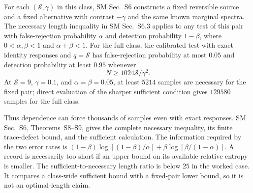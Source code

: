 \begin{theorem}\label{thm:main-cost}
For each $(\mathcal S,\gamma)$ in this class, SM Sec.~S6 constructs a fixed reversible source and a fixed alternative with contrast $-\gamma$ and the same known marginal spectra. The necessary length inequality in SM Sec.~S6.3 applies to any test of this pair with false-rejection probability $\alpha$ and detection probability $1-\beta$, where $0<\alpha,\beta<1$ and $\alpha+\beta<1$. For the full class, the calibrated test with exact identity responses and $q=\mathcal S$ has false-rejection probability at most $0.05$ and detection probability at least $0.95$ whenever
\begin{equation}
 N\ge1024\mathcal S/\gamma^2.\label{eq:cost-uniform}
\end{equation}
At $\mathcal S=9$, $\gamma=0.1$, and $\alpha=\beta=0.05$, at least $5214$ samples are necessary for the fixed pair; direct evaluation of the sharper sufficient condition gives $129580$ samples for the full class.
\end{theorem}
Thus dependence can force thousands of samples even with exact responses. SM Sec.~S6, Theorems~S8--S9, gives the complete necessary inequality, its finite trace-defect bound, and the sufficient calculation. The information required by the two error rates is $(1-\beta)\log[(1-\beta)/\alpha]+\beta\log[\beta/(1-\alpha)]$. A record is necessarily too short if an upper bound on its available relative entropy is smaller. The sufficient-to-necessary length ratio is below $25$ in the worked case. It compares a class-wide sufficient bound with a fixed-pair lower bound, so it is not an optimal-length claim.
